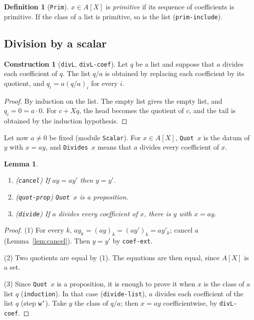 \documentclass[11pt]{amsart}
\newtheorem{lemma}[theorem]{Lemma}
\theoremstyle{definition}
\newtheorem{definition}[theorem]{Definition}
\newtheorem{construction}[theorem]{Construction}
\theoremstyle{remark}
\newcommand{\nm}[1]{\textup{\texttt{#1}}}
\begin{document}
\begin{definition}[\nm{Prim}]
$x\in A[X]$ is \emph{primitive} if its sequence of coefficients is
primitive. If the class of a list is primitive, so is the list
(\nm{prim-include}).
\end{definition}

\subsection{Division by a scalar}

\begin{construction}[\nm{divL}, \nm{divL-coef}]
Let $q$ be a list and suppose that $a$ divides each coefficient of $q$.
The list $q/a$ is obtained by replacing each coefficient by its quotient,
and $q_i = a(q/a)_i$ for every $i$.
\end{construction}
\begin{proof}
By induction on the list. The empty list gives the empty list, and
$q_i = 0 = a\cdot0$. For $c + Xq$, the head becomes the quotient of $c$,
and the tail is obtained by the induction hypothesis.
\end{proof}

\noindent Let now $a\neq0$ be fixed (module \nm{Scalar}). For $x\in A[X]$,
\nm{Quot}~$x$ is the datum of $y$ with $x = ay$, and \nm{Divides}~$x$ means
that $a$ divides every coefficient of $x$.

\begin{lemma}
\begin{enumerate}
\item (\nm{cancel}) If $ay = ay'$ then $y=y'$.
\item (\nm{quot-prop}) \nm{Quot}~$x$ is a proposition.
\item (\nm{divide}) If $a$ divides every coefficient of $x$, there is $y$
  with $x = ay$.
\end{enumerate}
\end{lemma}
\begin{proof}
(1) For every $k$, $ay_k = (ay)_k = (ay')_k = ay'_k$; cancel $a$
(Lemma~\ref{lem:cancel}). Then $y=y'$ by \nm{coef-ext}.

(2) Two quotients are equal by (1). The equations are then equal, since
$A[X]$ is a set.

(3) Since \nm{Quot}~$x$ is a proposition, it is enough to prove it when
$x$ is the class of a list $q$ (\nm{induction}). In that case
(\nm{divide-list}), $a$ divides each coefficient of the list $q$ (step
\nm{w'}). Take $y$ the class of $q/a$; then $x = ay$ coefficientwise, by
\nm{divL-coef}.
\end{proof}
\end{document}
